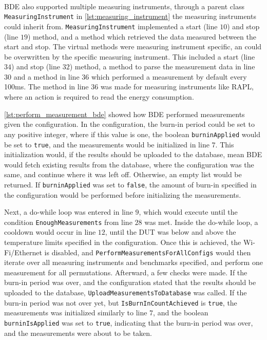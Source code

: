 \paragraph*{}
BDE also supported multiple measuring instruments, through a parent class \texttt{MeasuringInstrument} in \cref{lst:measuring_instrument} the measuring instruments could inherit from. \texttt{MeasuringInstrument} implemented a start (line $10$) and stop (line $19$) method, and a method which retrieved the data measured between the start and stop. The virtual methods were measuring instrument specific, an could be overwritten by the specific measuring instrument. This included a start (line $34$) and stop (line $32$) method, a method to parse the measurement data in line $30$ and a method in line $36$ which performed a measurement by default every 100ms. The method in line $36$ was made for measuring instruments like RAPL, where an action is required to read the energy consumption.


\cref{lst:perform_measurement_bde} showed how BDE performed measurements given the configuration. In the configuration, the burn-in period could be set to any positive integer, where if this value is one, the boolean \texttt{burninApplied} would be set to \texttt{true}, and the measurements would be initialized in line $7$. This initialization would, if the results should be uploaded to the database, mean BDE would fetch existing results from the database, where the configuration was the same, and continue where it was left off. Otherwise, an empty list would be returned. If \texttt{burninApplied} was set to \texttt{false}, the amount of burn-in specified in the configuration would be performed before initializing the measurements.



Next, a do-while loop was entered in line $9$, which would execute until the condition \texttt{EnoughMeasurements} from line $28$ was met. Inside the do-while loop, a cooldown would occur in line $12$, until the DUT was below and above the temperature limits specified in the configuration. Once this is achieved, the Wi-Fi/Ethernet is disabled, and \texttt{PerformMeasurementsForAllConfigs} would then iterate over all measuring instruments and benchmarks specified, and perform one measurement for all permutations. Afterward, a few checks were made. If the burn-in period was over, and the configuration stated that the results should be uploaded to the database, \texttt{UploadMeasurementsToDatabase} was called. If the burn-in period was not over yet, but \texttt{IsBurnInCountAchieved} is \texttt{true}, the measurements was initialized similarly to line $7$, and the boolean \texttt{burninIsApplied} was set to \texttt{true}, indicating that the burn-in period was over, and the measurements were about to be taken. 
